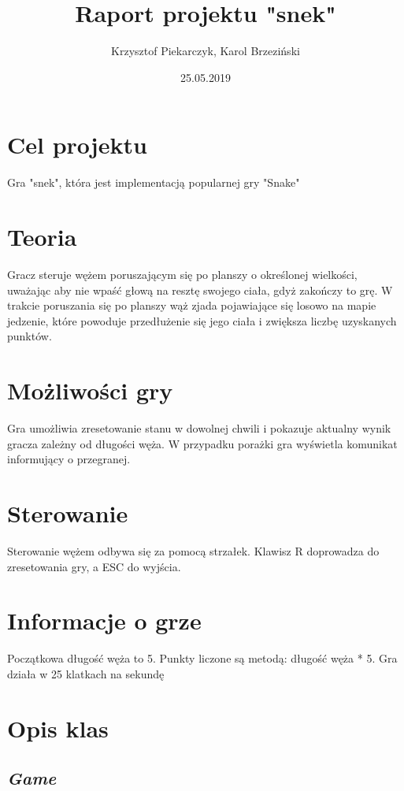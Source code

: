 \documentclass[12pt]{article}
\title{Raport projektu "snek"}
\author{Krzysztof Piekarczyk, Karol Brzeziński}
\date{25.05.2019}
\begin{document}
\maketitle


\section{Cel projektu}

Gra "snek", która jest implementacją popularnej gry "Snake"

\section{Teoria}

Gracz steruje wężem poruszającym się po planszy o określonej wielkości, uważając aby nie wpaść głową na resztę swojego ciała, gdyż zakończy to grę. W trakcie poruszania się po planszy wąż zjada pojawiające się losowo na mapie jedzenie, które powoduje przedłużenie się jego ciała i zwiększa liczbę uzyskanych punktów.

\section{Możliwości gry}

Gra umożliwia zresetowanie stanu w dowolnej chwili i pokazuje aktualny wynik gracza zależny od długości węża. W przypadku porażki gra wyświetla komunikat informujący o przegranej.

\section{Sterowanie}

Sterowanie wężem odbywa się za pomocą strzałek. Klawisz R doprowadza do zresetowania gry, a ESC do wyjścia.

\section{Informacje o grze}

Początkowa długość węża to 5. Punkty liczone są metodą: długość węża * 5. Gra działa w 25 klatkach na sekundę

\section{Opis klas}

\subsection{\textbf{\textit{Game}}}
\end{document}
